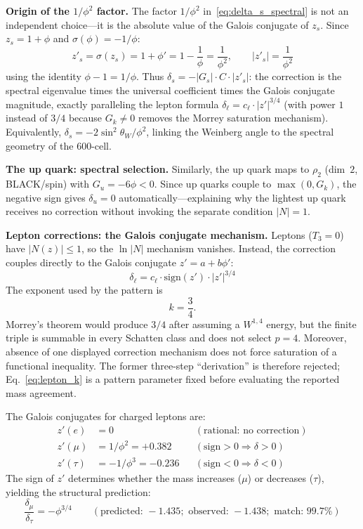 \documentclass[12pt,a4paper]{article}
\theoremstyle{definition}
\begin{document}
\textbf{Origin of the $1/\phi^2$ factor.}  The factor $1/\phi^2$ in~\eqref{eq:delta_s_spectral} is not an independent choice---it is the absolute value of the Galois conjugate of $z_s$.  Since $z_s = 1 + \phi$ and $\sigma(\phi) = -1/\phi$:
\begin{equation}
z'_s = \sigma(z_s) = 1 + \phi' = 1 - \frac{1}{\phi} = \frac{1}{\phi^2}, \qquad |z'_s| = \frac{1}{\phi^2}
\label{eq:zs_galois}
\end{equation}
using the identity $\phi - 1 = 1/\phi$.  Thus $\delta_s = -|G_s|\cdot C \cdot |z'_s|$: the correction is the spectral eigenvalue times the universal coefficient times the Galois conjugate magnitude, exactly paralleling the lepton formula $\delta_\ell = c_\ell \cdot |z'|^{3/4}$ (with power $1$ instead of $3/4$ because $G_k \neq 0$ removes the Morrey saturation mechanism).  Equivalently, $\delta_s = -2\sin^2\theta_W/\phi^2$, linking the Weinberg angle to the spectral geometry of the 600-cell.

\textbf{The up quark: spectral selection.}  Similarly, the up quark maps to $\rho_2$ (dim~$2$, BLACK/spin) with $G_u = -6\phi < 0$.  Since up quarks couple to $\max(0, G_k)$, the negative sign gives $\delta_u = 0$ automatically---explaining why the lightest up quark receives no correction without invoking the separate condition $|N| = 1$.

\textbf{Lepton corrections: the Galois conjugate mechanism.} Leptons ($T_3 = 0$) have $|N(z)| \leq 1$, so the $\ln|N|$ mechanism vanishes. Instead, the correction couples directly to the Galois conjugate $z' = a + b\phi'$:
\begin{equation}
\boxed{\delta_\ell = c_\ell \cdot \mathrm{sign}(z') \cdot |z'|^{3/4}}
\label{eq:lepton_corr}
\end{equation}
The exponent used by the pattern is
\begin{equation}
\boxed{k=\frac34.}
\label{eq:lepton_k}
\end{equation}
Morrey's theorem would produce $3/4$ after assuming a $W^{1,4}$ energy, but
the finite triple is summable in every Schatten class and does not select
$p=4$.  Moreover, absence of one displayed correction mechanism does not
force saturation of a functional inequality.  The former three-step
``derivation'' is therefore rejected; Eq.~\eqref{eq:lepton_k} is a pattern
parameter fixed before evaluating the reported mass agreement.

The Galois conjugates for charged leptons are:
\begin{align}
z'(e) &= 0 && (\text{rational: no correction}) \\
z'(\mu) &= 1/\phi^2 = +0.382 && (\text{sign} > 0 \Rightarrow \delta > 0) \\
z'(\tau) &= -1/\phi^3 = -0.236 && (\text{sign} < 0 \Rightarrow \delta < 0)
\end{align}
The sign of $z'$ determines whether the mass increases ($\mu$) or decreases ($\tau$), yielding the structural prediction:
\begin{equation}
\frac{\delta_\mu}{\delta_\tau} = -\phi^{3/4} \qquad (\text{predicted: } -1.435; \text{ observed: } -1.438; \text{ match: } 99.7\%)
\end{equation}
\end{document}
